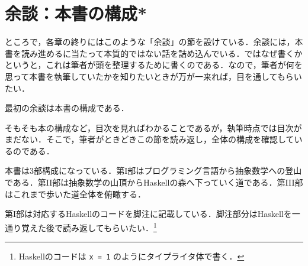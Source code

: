 \documentclass[a5paper,twoside,fleqn,draft]{jsbook}
\newcommand{\programminglanguage}[1]{\textsf{#1}}
\newcommand{\haskell}{\programminglanguage{Haskell}}
\newcommand{\code}[1]{\texttt{#1}}
\begin{document}


\section{余談：本書の構成*}

ところで，各章の終りにはこのような「余談」の節を設けている．余談には，本書を読み進めるに当たって本質的ではない話を詰め込んでいる．ではなぜ書くかというと，これは筆者が頭を整理するために書くのである．なので，筆者が何を思って本書を執筆していたかを知りたいときが万が一来れば，目を通してもらいたい．

最初の余談は本書の構成である．

そもそも本の構成など，目次を見ればわかることであるが，執筆時点では目次がまだない．そこで，筆者がときどきこの節を読み返し，全体の構成を確認しているのである．

本書は3部構成になっている．第I部はプログラミング言語から抽象数学への登山である．第II部は抽象数学の山頂から\haskell の森へ下っていく道である．第III部はこれまで歩いた道全体を俯瞰する．

第I部は対応する\haskell のコードを脚注に記載している．脚注部分は\haskell を一通り覚えた後で読み返してもらいたい．\footnote{\haskell のコードは \code{x = 1} のようにタイプライタ体で書く．}
\end{document}
